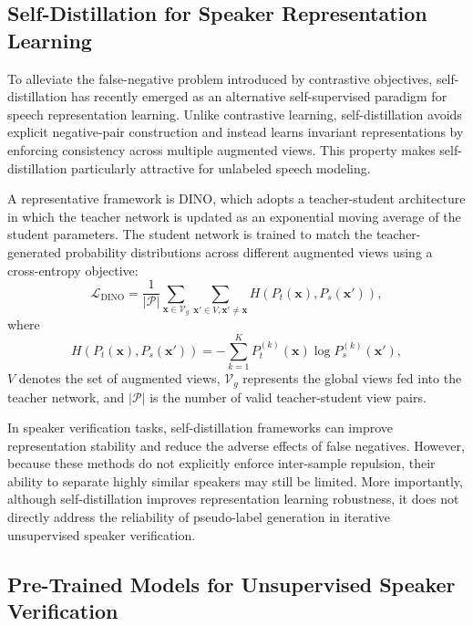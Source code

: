 \documentclass[lettersize,journal]{IEEEtran}
\begin{document}
\subsection{Self-Distillation for Speaker Representation Learning}

To alleviate the false-negative problem introduced by contrastive objectives, self-distillation has recently emerged as an alternative self-supervised paradigm for speech representation learning. Unlike contrastive learning, self-distillation avoids explicit negative-pair construction and instead learns invariant representations by enforcing consistency across multiple augmented views. This property makes self-distillation particularly attractive for unlabeled speech modeling.

A representative framework is DINO, which adopts a teacher-student architecture in which the teacher network is updated as an exponential moving average of the student parameters. The student network is trained to match the teacher-generated probability distributions across different augmented views using a cross-entropy objective:
\begin{equation}
\mathcal{L}_{\mathrm{DINO}}
=
\frac{1}{|\mathcal{P}|}
\sum_{\mathbf{x}\in\mathcal{V}_g}
\sum_{\mathbf{x}'\in V,\mathbf{x}'\neq \mathbf{x}}
H\!\left(P_t(\mathbf{x}),P_s(\mathbf{x}')\right),
\end{equation}
where
\begin{equation}
H\!\left(P_t(\mathbf{x}),P_s(\mathbf{x}')\right)
=
-\sum_{k=1}^{K}
P_t^{(k)}(\mathbf{x})
\log
P_s^{(k)}(\mathbf{x}'),
\end{equation}
$V$ denotes the set of augmented views, $\mathcal{V}_g$ represents the global views fed into the teacher network, and $|\mathcal{P}|$ is the number of valid teacher-student view pairs.

In speaker verification tasks, self-distillation frameworks can improve representation stability and reduce the adverse effects of false negatives. However, because these methods do not explicitly enforce inter-sample repulsion, their ability to separate highly similar speakers may still be limited. More importantly, although self-distillation improves representation learning robustness, it does not directly address the reliability of pseudo-label generation in iterative unsupervised speaker verification.

\subsection{Pre-Trained Models for Unsupervised Speaker Verification}
\end{document}
